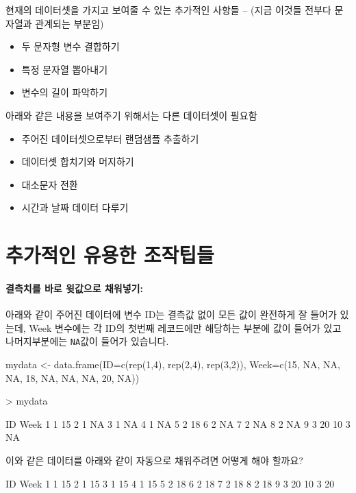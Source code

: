  
현재의 데이터셋을 가지고 보여줄 수 있는 추가적인 사항들 -- (지금 이것들 전부다 문자열과 관계되는 부분임) 
\begin{itemize}
\item 두 문자형 변수 결합하기
\item 특정 문자열 뽑아내기
\item 변수의 길이 파악하기
\end{itemize}

아래와 같은 내용을 보여주기 위해서는 다른 데이터셋이 필요함 
\begin{itemize}
\item 주어진 데이터셋으로부터 랜덤샘플 추출하기
\item 데이터셋 합치기와 머지하기 
\item 대소문자 전환 
\item 시간과 날짜 데이터 다루기 
\end{itemize}



\section{추가적인 유용한 조작팁들}
 
\paragraph{결측치를 바로 윗값으로 채워넣기: } 아래와 같이 주어진 데이터에 변수 ID는 결측값 없이 모든 값이 완전하게 잘 들어가 있는데, Week 변수에는 각 ID의 첫번째 레코드에만 해당하는 부분에 값이 들어가 있고 나머지부분에는 \texttt{NA}값이 들어가 있습니다. 

\begin{Schunk}
\begin{Soutput}
mydata <- data.frame(ID=c(rep(1,4), rep(2,4), rep(3,2)), Week=c(15, NA, NA, NA, 18, NA, NA, NA, 20, NA))

> mydata		

   ID Week
1   1   15
2   1   NA
3   1   NA
4   1   NA
5   2   18
6   2   NA
7   2   NA
8   2   NA
9   3   20
10  3   NA
\end{Soutput}
\end{Schunk}

이와 같은 데이터를 아래와 같이 자동으로 채워주려면 어떻게 해야 할까요? 	
	
\begin{Schunk}
\begin{Soutput}
   ID Week
1   1   15
2   1   15
3   1   15
4   1   15
5   2   18
6   2   18
7   2   18
8   2   18
9   3   20
10  3   20
\end{Soutput}
\end{Schunk}
	

